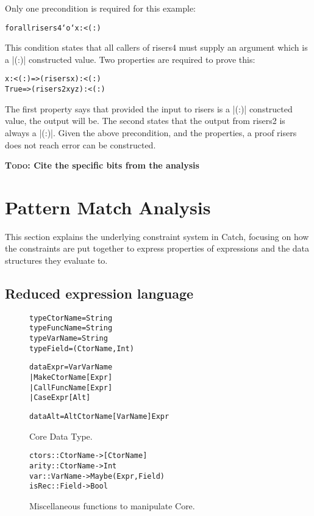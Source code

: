 \documentclass[preprint]{sigplanconf}
\newcommand{\C}[1]{\textsf{#1}}
\newcommand{\todo}[1]{\textbf{\textsc{Todo:} #1}}
\newenvironment{code}{\begin{alltt}\small}{\end{alltt}}
\begin{document}
Only one precondition is required for this example:

\begin{code}
forall risers4 `o` x :< (:)
\end{code}

This condition states that all callers of \C{risers4} must supply an argument which is a |(:)| constructed value. Two properties are required to prove this:

\begin{code}
x :< (:)  => (risers x       ) :< (:)
True      => (risers2 x y z  ) :< (:)
\end{code}

The first property says that provided the input to \C{risers} is a |(:)| constructed value, the output will be. The second states that the output from \C{risers2} is always a |(:)|. Given the above precondition, and the properties, a proof \C{risers} does not reach \C{error} can be constructed.

\todo{Cite the specific bits from the analysis}

\section{Pattern Match Analysis}
\label{sec:manipulate}

This section explains the underlying constraint system in Catch, focusing on how the constraints are put together to express properties of expressions and the data structures they evaluate to.

\subsection{Reduced expression language}
\label{sec:core}

\begin{figure}
\begin{code}
type CtorName  =  String
type FuncName  =  String
type VarName   =  String
type Field     =  (CtorName, Int)

data Expr  =  Var   VarName
           |  Make  CtorName  [Expr]
           |  Call  FuncName  [Expr]
           |  Case  Expr      [Alt]

data Alt = Alt CtorName [VarName] Expr
\end{code}
\caption{Core Data Type.}
\label{fig:core}
\end{figure}

\begin{figure}
\begin{code}
ctors     :: CtorName  -> [CtorName]
arity     :: CtorName  -> Int
var       :: VarName   -> Maybe (Expr, Field)
isRec     :: Field     -> Bool
\end{code}
\caption{Miscellaneous functions to manipulate Core.}
\end{figure}
\end{document}
